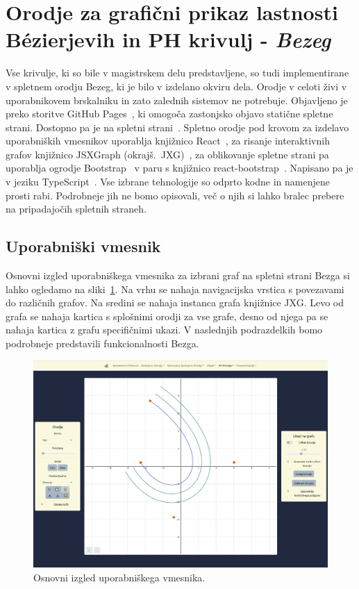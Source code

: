 \documentclass[isrm2, tisk]{fmfdelo}
\begin{document}
    \section{Orodje za grafični prikaz lastnosti Bézierjevih in PH krivulj - \textit{Bezeg}}
    Vse krivulje, ki so bile v magistrskem delu predstavljene, so tudi implementirane v spletnem orodju Bezeg, ki je bilo v izdelano okviru dela.
    Orodje v celoti živi v uporabnikovem brskalniku in zato zalednih sistemov ne potrebuje.
    Objavljeno je preko storitve GitHub Pages~\cite{github-pages}, ki omogoča zastonjsko objavo statične spletne strani.
    Dostopno pa je na spletni strani~\cite{spletna-bezeg}.
    Spletno orodje pod krovom za izdelavo uporabniških vmesnikov uporablja knjižnico React~\cite{react},
    za risanje interaktivnih grafov knjižnico JSXGraph (okrajš.\ JXG)~\cite{jxg}, za oblikovanje spletne strani pa uporablja ogrodje Bootstrap~\cite{bootstrap} v paru s knjižnico react-bootstrap~\cite{react-bootstrap}.
    Napisano pa je v jeziku TypeScript~\cite{typescript}.
    Vse izbrane tehnologije so odprto kodne in namenjene prosti rabi.
    Podrobneje jih ne bomo opisovali, več o njih si lahko bralec prebere na pripadajočih spletnih straneh.

    \subsection{Uporabniški vmesnik}\label{subsec:gui}
    Osnovni izgled uporabniškega vmesnika za izbrani graf na spletni strani Bezga si lahko ogledamo na sliki~\ref{fig:bezeg:osnovni-izgled}.
    Na vrhu se nahaja navigacijska vrstica s povezavami do različnih grafov.
    Na sredini se nahaja instanca grafa knjižnice JXG.
    Levo od grafa se nahaja kartica s splošnimi orodji za vse grafe, desno od njega pa se nahaja kartica z grafu specifičnimi ukazi.
    V naslednjih podrazdelkih bomo podrobneje predstavili funkcionalnosti Bezga.
    \begin{figure}[h]
        \centering
        \includegraphics[width = \textwidth]{images/bezeg/osnovni-izgled}
        \caption{Osnovni izgled uporabniškega vmesnika.}
        \label{fig:bezeg:osnovni-izgled}
    \end{figure}
\end{document}
